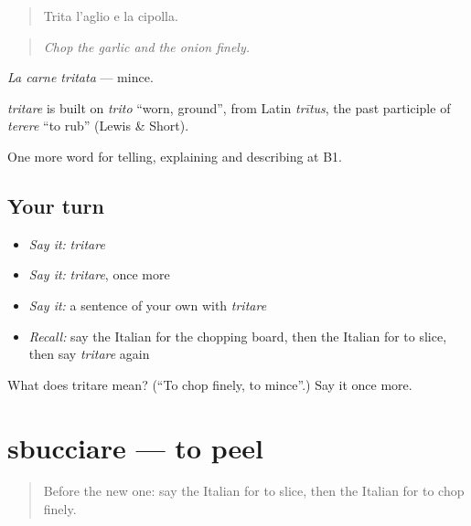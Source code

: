 \begin{quote}
Trita l'aglio e la cipolla.
\end{quote}

\begin{quote}
\emph{Chop the garlic and the onion finely.}
\end{quote}

\emph{La carne tritata} — mince.

\begin{cousinweb}
\emph{tritare} is built on \emph{trito} \textquotedblleft{}worn, ground\textquotedblright{}, from Latin \emph{trītus}, the past participle of \emph{terere} \textquotedblleft{}to rub\textquotedblright{} (Lewis \& Short).
\end{cousinweb}

\begin{grammarlens}[title={What you've built}]
One more word for telling, explaining and describing at B1.
\end{grammarlens}

\subsection*{Your turn}
\begin{itemize}
\raggedright
  \item \emph{Say it:} \emph{tritare}
  \item \emph{Say it:} \emph{tritare}, once more
  \item \emph{Say it:} a sentence of your own with \emph{tritare}
  \item \emph{Recall:} say the Italian for the chopping board, then the Italian for to slice, then say \emph{tritare} again
\end{itemize}

\begin{tcolorbox}[breakable,colback=teal!4,colframe=teal!35!black,title={Before you move on}]
What does tritare mean? (\textquotedblleft{}To chop finely, to mince\textquotedblright{}.) Say it once more.
\end{tcolorbox}
\section[sbucciare]{sbucciare — to peel}

\label{lesson:IT-C332-sbucciare}



\begin{quote}
Before the new one: say the Italian for to slice, then the Italian for to chop finely.
\end{quote}

